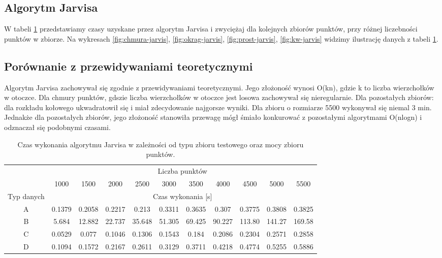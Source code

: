 \documentclass[11pt]{article}
\theoremstyle{remark} \newtheorem{definition}{def.}
\theoremstyle{definition} \newtheorem{twierdzenie}{tw.}
\begin{document}
\subsection{Algorytm Jarvisa}

W tabeli \ref{tab:jarvis} przedstawiamy czasy uzyskane przez algorytm Jarvisa i zwyciężaj dla kolejnych zbiorów punktów, przy różnej liczebności punktów w zbiorze. Na wykresach \ref{fig:chmura-jarvis}, 
\ref{fig:okrag-jarvis}, \ref{fig:prost-jarvis}, \ref{fig:kw-jarvis} widzimy ilustrację danych z tabeli \ref{tab:jarvis}.

\subsection{Porównanie z przewidywaniami teoretycznymi}
Algorytm Jarvisa zachowywał się zgodnie z przewidywaniami teoretycznymi. Jego złożoność wynosi O(kn), gdzie k to liczba wierzchołków w otoczce.
Dla chmury punktów, gdszie liczba wierzchołków w otoczce jest losowa zachowywał się nieregularnie. Dla pozostałych zbiorów: dla rozkładu kołowego
ukwadratowił się i miał zdecydowanie najgorsze wyniki. Dla zbioru o rozmiarze 5500 wykonywał się niemal 3 min. Jednakże dla pozostałych zbiorów, jego złożoność stanowiła
przewagę mógł śmiało konkurować z pozostałymi algorytmami O(nlogn) i odznaczał się podobnymi czasami.

\begin{table}[]
\centering
\caption{Czas wykonania algorytmu Jarvisa w zależności od typu zbioru testowego oraz mocy zbioru punktów.}
\label{tab:jarvis}
\begin{tabular}{c|c|c|c|c|c|c|c|c|c|c|}
\cline{2-11}
\multicolumn{1}{l|}{} & \multicolumn{10}{c|}{Liczba punktów} \\ \cline{2-11} 
\multicolumn{1}{l|}{} & 1000 & 1500 & 2000 & 2500 & 3000 & 3500 & 4000 & 4500 & 5000 & 5500 \\ \hline
\multicolumn{1}{|c|}{Typ danych} & \multicolumn{10}{c|}{Czas wykonania {[}s{]}} \\ \hline
\multicolumn{1}{|c|}{A} & 0.1379 & 0.2058 & 0.2217 & 0.213 & 0.3311 & 0.3635 & 0.307 & 0.3775 & 0.3808 & 0.3825 \\ \hline
\multicolumn{1}{|c|}{B} & 5.684 & 12.882 & 22.737 & 35.648 & 51.305 & 69.425 & 90.227 & 113.80 & 141.27 & 169.58 \\ \hline
\multicolumn{1}{|c|}{C} & 0.0529 & 0.077 & 0.1046 & 0.1306 & 0.1543 & 0.184 & 0.2086 & 0.2304 & 0.2571 & 0.2858 \\ \hline
\multicolumn{1}{|c|}{D} & 0.1094 & 0.1572 & 0.2167 & 0.2611 & 0.3129 & 0.3711 & 0.4218 & 0.4774 & 0.5255 & 0.5886 \\ \hline
\end{tabular}
\end{table}
\end{document}
